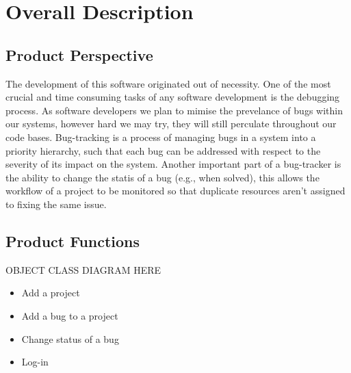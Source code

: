 \documentclass{article}
\newcommand{\comment}[1]{}
\begin{document}
\section{Overall Description}
\subsection{Product Perspective}
\comment{
Describe the context and origin of the product being specified in this \acrshort{srs}. For example, state whether this product is a follow-on member of a product family, a replacment for existing systems, or a new, self-contained product. If the \acrshort{srs} defines a component of a larger system, relate the requirments of the larger system to the functionality of this software and identift interfaces between the two. A simple diagram that shows the major components of the overall system, subsystem interconnections, and external interfaces can be helpful.
}
The development of this software originated out of necessity. One of the most crucial and time consuming tasks of any software development is the debugging process. As software developers we plan to mimise the prevelance of bugs within our systems, however hard we may try, they will still perculate throughout our code bases. Bug-tracking is a process of managing bugs in a system into a priority hierarchy, such that each bug can be addressed with respect to the severity of its impact on the system. Another important part of a bug-tracker is the ability to change the statis of a bug (e.g., when solved), this allows the workflow of a project to be monitored so that duplicate resources aren't assigned to fixing the same issue.
\subsection{Product Functions}
\comment{
	Summarize the major functions to the product must perform or must let the user perform. Details will be provided in Section 3, so only a high level summary (such as a bullet list) is needed here. Organize the functions to make them understandable to any ready of the SRS. A picture of the major groups of related requirements and how they relate, such as a top level data flow diagram or object class diagram, is often effective.
	}
OBJECT CLASS DIAGRAM HERE
\begin{itemize}
\item Add a project 
\item Add a bug to a project 
\item Change status of a bug
\item Log-in  
\end{itemize}
\end{document}
